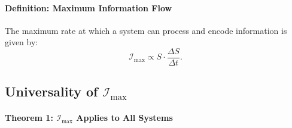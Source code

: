 \documentclass[12pt]{article}
\begin{document}
\paragraph{Definition: Maximum Information Flow}
The maximum rate at which a system can process and encode information is given by:
\[
\mathcal{I}_{\text{max}} \propto S \cdot \frac{\Delta S}{\Delta t}.
\]

\subsection{Universality of \(\mathcal{I}_{\text{max}}\)}

\paragraph{Theorem 1: \(\mathcal{I}_{\text{max}}\) Applies to All Systems}
\end{document}

